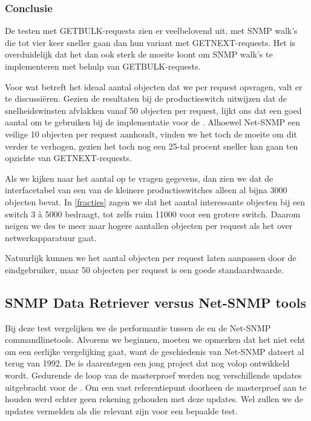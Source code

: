\subsubsection{Conclusie}

De testen met GETBULK-requests zien er veelbelovend uit, met SNMP walk's die tot vier keer sneller gaan dan hun variant met GETNEXT-requests.
Het is overduidelijk dat het dan ook sterk de moeite loont om SNMP walk's te implementeren met behulp van GETBULK-requests.

Voor wat betreft het ideaal aantal objecten dat we per request opvragen, valt er te discussiëren.{}
Gezien de resultaten bij de productieswitch uitwijzen dat de snelheidswinsten afvlakken vanaf 50 objecten per request,
lijkt ons dat een goed aantal om te gebruiken bij de implementatie voor de \nwmretriever.
Alhoewel Net-SNMP een veilige 10 objecten per request aanhoudt,
vinden we het toch de moeite om dit verder te verhogen, gezien het toch nog een 25-tal procent sneller kan gaan ten opzichte van GETNEXT-requests.

Als we kijken naar het aantal op te vragen gegevens, dan zien we dat de interfacetabel van een van de kleinere productieswitches alleen al bijna 3000 objecten bevat.
In \cref{fracties} zagen we dat het aantal interessante objecten bij een switch 3 à 5000 bedraagt, tot zelfs ruim 11000 voor een grotere switch.
Daarom neigen we des te meer naar hogere aantallen objecten per request als het over netwerkapparatuur gaat.

Natuurlijk kunnen we het aantal objecten per request laten aanpassen door de eindgebruiker,
maar 50 objecten per request is een goede standaardwaarde.




\subsection{SNMP Data Retriever versus Net-SNMP tools}


Bij deze test vergelijken we de performantie tussen de \nwmretriever{} en de Net-SNMP commandlinetools.
Alvorens we beginnen, moeten we opmerken dat het niet echt om een eerlijke vergelijking gaat,
want de geschiedenis van Net-SNMP dateert al terug van 1992\cite{net-snmp-history}.
De \nwmretriever{} is daarentegen een jong project dat nog volop ontwikkeld wordt.
Gedurende de loop van de masterproef werden nog verschillende updates uitgebracht voor de \nwmretriever{}.
Om een vast referentiepunt doorheen de masterproef aan te houden werd echter geen rekening gehouden met deze updates.
Wel zullen we de updates vermelden als die relevant zijn voor een bepaalde test.

